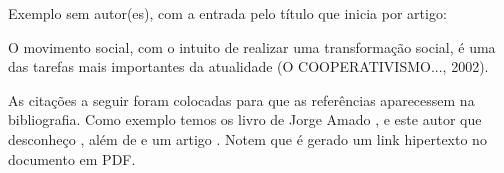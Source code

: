 \bigskip

{\color{red}
Exemplo sem autor(es), com a entrada pelo título que inicia por artigo:}

\bigskip

O movimento social, com o intuito de realizar uma transformação social, é uma das tarefas mais importantes da atualidade
(O COOPERATIVISMO..., 2002).\\

\bigskip

As citações a seguir foram colocadas para que as referências aparecessem na bibliografia. Como exemplo temos os livro de Jorge Amado \cite{book:AMADO}  \cite{book:AMADO2}, e este autor que desconheço \cite{book:OHANSSON}, além de \cite{book:ENGEL} e um artigo \cite{art:PRADO}. Notem que é gerado um link hipertexto no documento em PDF.
